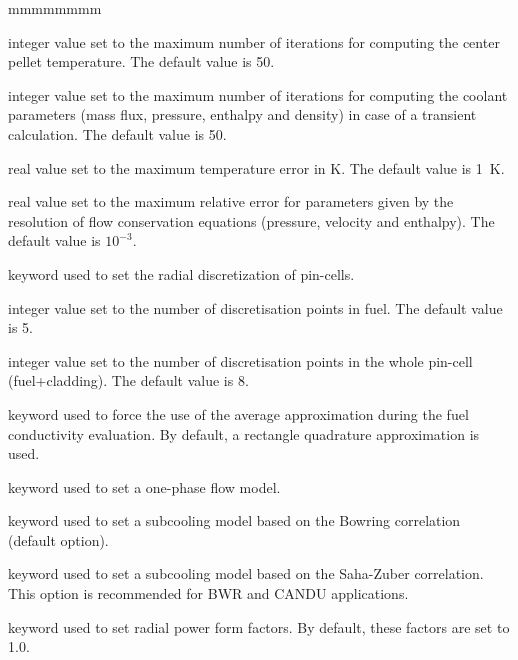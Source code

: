 \begin{ListeDeDescription}{mmmmmmmm}
\item[\dusa{maxit2}] integer value set to the maximum number of iterations for computing the
center pellet temperature. The default value is 50.

\item[\dusa{maxit3}] integer value set to the maximum number of iterations for computing the
coolant parameters (mass flux, pressure, enthalpy and density) in case of a transient calculation. The default value is 50.

\item[\dusa{ermaxt}] real value set to the maximum temperature error in K. The default value is 1~K.

\item[\dusa{ermaxc}] real value set to the maximum relative  error for parameters given by the resolution of flow conservation equations (pressure, velocity and enthalpy). The default value is $10^{-3}$.

\item[\moc{RODMESH}] keyword used to set the radial discretization of pin-cells.

\item[\dusa{nb1}] integer value set to the number of discretisation points in fuel. The default value
is 5.

\item[\dusa{nb2}] integer value set to the number of discretisation points in the whole pin-cell (fuel+cladding). The default value
is 8.

\item[\moc{FORCEAVE}] keyword used to force the use of the average approximation during the fuel conductivity evaluation.
By default, a rectangle quadrature approximation is used.

\item[\moc{MONO}] keyword used to set a one-phase flow model.

\item[\moc{BOWR}] keyword used to set a subcooling model based on the Bowring correlation\cite{bowring} (default option).

\item[\moc{SAHA}] keyword used to set a subcooling model based on the Saha-Zuber correlation\cite{lahey}. This option is recommended for BWR and CANDU applications.

\item[\moc{RAD-PROF}] keyword used to set radial power form factors. By default, these factors are set to 1.0.


\end{ListeDeDescription}
